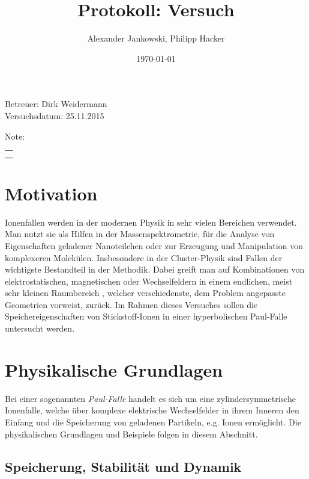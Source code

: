 \documentclass[numbers=noenddot,a4paper,notitlepage,twoside,BCOR15mm]{scrartcl}
\title{Protokoll: Versuch} %
\author{Alexander Jankowski, Philipp Hacker}
\date{\today}
\newcommand{\tilt}[1]{\textit{#1}}
\begin{document}
	\maketitle
	\begin{center}
		Betreuer: Dirk Weidermann \\ %
		Versuchsdatum: 25.11.2015 \\ %
		\begin{table}[H]
			\centering
			Note: %
			\begin{tabularx}{1.5cm}{|X|}
				\hline \\ \\
				\hline
			\end{tabularx}
		\end{table}
	\end{center}
	\vspace*{\fill}
	\tableofcontents
	\vfill
	\clearpage
	\section{Motivation}

		Ionenfallen werden in der modernen Physik in sehr vielen Bereichen verwendet. Man nutzt sie als Hilfen in der Massenspektrometrie, für die Analyse von Eigenschaften geladener Nanoteilchen oder zur Erzeugung und Manipulation von komplexeren Molekülen. Insbesondere in der Cluster-Physik sind Fallen der wichtigste Bestandteil in der Methodik. Dabei greift man auf Kombinationen von elektrostatischen, magnetischen oder Wechselfeldern in einem endlichen, meist sehr kleinen Raumbereich , welcher verschiedenste, dem Problem angepasste Geometrien vorweist, zurück. Im Rahmen dieses Versuches sollen die Speichereigenschaften von Stickstoff-Ionen in einer hyperbolischen Paul-Falle untersucht werden. 


	\clearpage
	\section{Physikalische Grundlagen}

		Bei einer sogenannten \tilt{Paul-Falle} handelt es sich um eine zylindersymmetrische Ionenfalle, welche über komplexe elektrische Wechselfelder in ihrem Inneren den Einfang und die Speicherung von geladenen Partikeln, e.g. Ionen ermöglicht. Die physikalischen Grundlagen und Beispiele folgen in diesem Abschnitt.

		\subsection{Speicherung, Stabilität und Dynamik}
\end{document}
